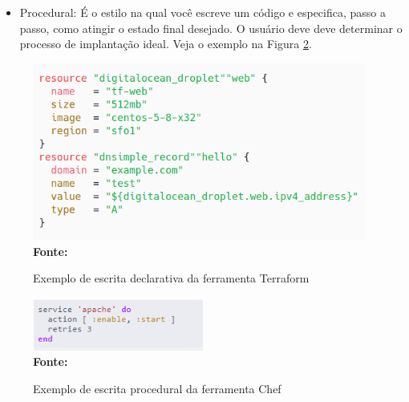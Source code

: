  \begin{itemize}
    \item Procedural: É o estilo na qual você escreve um código e especifica, passo a passo, como atingir o estado final desejado. O usuário deve deve determinar o processo de implantação ideal. Veja o exemplo na Figura \ref{fig:figura1}.
   \end{itemize}
   
 \begin{figure}[ht]
	\centering	
	\caption[\hspace{0.1cm}Exemplo declarativo]{Exemplo de escrita declarativa da ferramenta Terraform}
	\vspace{-0.4cm}
	\includegraphics[width=0.98\textwidth]{artigo/figuras/terraform-declarative-exemple-01.png}
	 \vspace{-0.2cm}
	\\\textbf{\footnotesize Fonte: \cite{terraform01} }
	\label{fig:figura2}
\end{figure}
\vspace{-0.5cm}
 
\begin{figure}[h]
	\centering	
	\caption[\hspace{0.1cm}Exemplo procedural]{Exemplo de escrita procedural da ferramenta Chef}
	\vspace{-0.4cm}
	\includegraphics[width=0.5\textwidth]{figuras/chef-io-exemplo-procedural.png}
	 \vspace{-0.2cm}
	\\\textbf{\footnotesize Fonte: \cite{chef01}}
	\label{fig:figura1}
\end{figure}
\vspace{-0.5cm}

